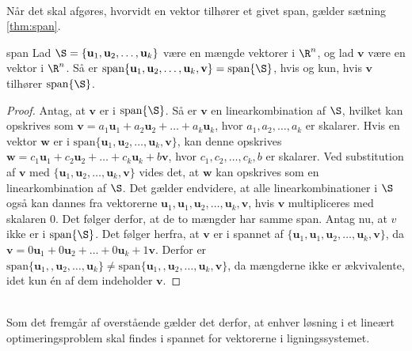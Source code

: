 \\
%
%
Når det skal afgøres, hvorvidt en vektor tilhører et givet span, gælder sætning \ref{thm:span}.
%
\begin{thm}{}{span}
%
Lad $\S =  \{ \mathbf{u}_1, \mathbf{u}_2 , \ldots , \mathbf{u}_k \}$ være en mængde vektorer i $\R^n$, og lad $\mathbf{v}$ være en vektor i $\R^n$.
Så er $\text{span}\{ \mathbf{u}_1, \mathbf{u}_2 , \ldots , \mathbf{u}_k , \mathbf{v}\} =\text{span}\{\S\}$, hvis og kun, hvis $\mathbf{v}$ tilhører $\text{span}\{\S\}$.
%
\end{thm}
%
%
\begin{proof}
%
Antag, at $\mathbf{v}$ er i $\text{span}\{\S\}$. Så er $\mathbf{v}$ en linearkombination af $\S$, hvilket kan opskrives som $\mathbf{v}=a_1\mathbf{u}_1+a_2\mathbf{u}_2+ \ldots + a_k\mathbf{u}_k$, hvor $a_1,a_2,\ldots, a_k$ er skalarer. 
Hvis en vektor $\mathbf{w}$ er i $\text{span}\{ \mathbf{u}_1, \mathbf{u}_2 , \ldots , \mathbf{u}_k , \mathbf{v}\}$, 
kan denne opskrives $\mathbf{w}=c_1\mathbf{u}_1+c_2\mathbf{u}_2+ \ldots + c_k\mathbf{u}_k+b\mathbf{v}$, hvor $c_1,c_2,\ldots, c_k, b$ er skalarer.
Ved substitution af $\mathbf{v}$ med $\{ \mathbf{u}_1, \mathbf{u}_2 , \ldots , \mathbf{u}_k , \mathbf{v}\}$ vides det, at $\mathbf{w}$ kan opskrives som en linearkombination af $\S$. 
Det gælder endvidere, at alle linearkombinationer i $\S$ også kan dannes fra vektorerne $\mathbf{u}_1,\mathbf{u}_1, \mathbf{u}_2 , \ldots , \mathbf{u}_k , \mathbf{v}$, hvis $\mathbf{v}$ multipliceres med skalaren $0$.
Det følger derfor, at de to mængder har samme span. 
Antag nu, at $v$ ikke er i $\text{span}\{\S\}$. 
Det følger herfra, at $\mathbf{v}$ er i spannet af 
$\{ \mathbf{u}_1,\mathbf{u}_1, \mathbf{u}_2 , \ldots , \mathbf{u}_k , \mathbf{v}\}$, da 
$\mathbf{v}=0\mathbf{u}_1+0\mathbf{u}_2+ \ldots + 0\mathbf{u}_k+1\mathbf{v}$.
Derfor er
$\text{span}\{ \mathbf{u}_1,, \mathbf{u}_2 , \ldots , \mathbf{u}_k \}
\neq
\text{span}\{ \mathbf{u}_1,, \mathbf{u}_2 , \ldots , \mathbf{u}_k , \mathbf{v}\}$, 
da mængderne ikke er ækvivalente, idet kun én af dem indeholder $\mathbf{v}$. 
%
\end{proof}
\\
%
%
Som det fremgår af overstående gælder det derfor, at enhver løsning i et lineært optimeringsproblem skal findes i spannet for vektorerne i ligningssystemet. 
%